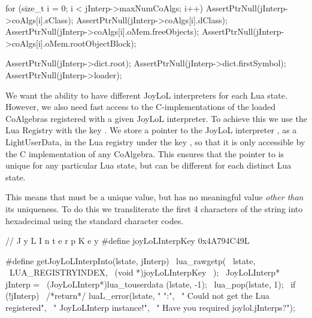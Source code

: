   for (size_t i = 0; i < jInterp->maxNumCoAlgs; i++) {
    AssertPtrNull(jInterp->coAlgs[i].sClass);
    AssertPtrNull(jInterp->coAlgs[i].dClass);
    AssertPtrNull(jInterp->coAlgs[i].oMem.freeObjects);
    AssertPtrNull(jInterp->coAlgs[i].oMem.rootObjectBlock);
  }
  
  AssertPtrNull(jInterp->dict.root);
  AssertPtrNull(jInterp->dict.firstSymbol);
  AssertPtrNull(jInterp->loader);
\stopCTest
\stopTestCase
\stopTestSuite


We want the ability to have different JoyLoL interpreters for each Lua 
state. However, we also need fast access to the C-implementations of the 
loaded CoAlgebras registered with a given JoyLoL interpreter. To achieve 
this we use the Lua Registry with the  key 
. We store a pointer to the JoyLoL interpreter 
, as a LightUserData, in the Lua registry under the key 
, so that it is only accessible by the C 
implementation of any CoAlgebra. This ensures that the pointer to 
 is unique for any particular Lua state, but can be 
different for each distinct Lua state. 

This means that  must be a unique value, but has no 
meaningful value \emph{other than} its uniqueness. To do this we 
transliterate the first 4 characters of the string  
into hexadecimal using the standard  character codes. 

\startCHeader
//                         J y L I n t e r p K e y
#define joyLoLInterpKey 0x4A794C49L

#define getJoyLoLInterpInto(lstate, jInterp)      \
  lua_rawgetp(                                    \
    lstate,                                       \
    LUA_REGISTRYINDEX,                            \
    (void *)joyLoLInterpKey                       \
  );                                              \
  JoyLoLInterp* jInterp =                         \
    (JoyLoLInterp*)lua_touserdata (lstate, -1);   \
  lua_pop(lstate, 1);                             \
  if (!jInterp) {                                 \
    /*return*/ luaL_error(lstate, "%
      "\nERROR:\n",                               \
      "  Could not get the Lua registered\n",     \
      "  JoyLoLInterp instance!\n",               \
      "  Have you required joylol.jInterps?\n");  \
  }
\stopCHeader


